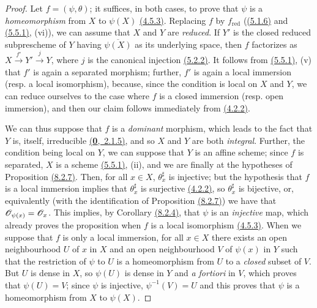 \begin{proof}
\label{proof-prop-1.8.2.8}
Let $f=(\psi,\theta)$; it suffices, in both cases, to prove that $\psi$ is a
{\it homeomorphism} from $X$ to $\psi(X)$ \hyperref[env-1.4.5.3]{(4.5.3)}. Replacing $f$ by
$f_\text{red}$ (\hyperref[env-1.5.1.6]{(5.1.6)} and \hyperref[env-1.5.5.1]{(5.5.1)}, (vi)), we can assume that $X$
and $Y$ are {\it reduced}. If $Y'$ is the closed reduced subprescheme of $Y$
having $\overline{\psi(X)}$ as its underlying space, then $f$ factorizes as
$X\xrightarrow{f'}Y'\xrightarrow{j}Y$, where $j$ is the canonical injection
\hyperref[env-1.5.2.2]{(5.2.2)}. It follows from \hyperref[env-1.5.5.1]{(5.5.1)}, (v) that $f'$ is again a
separated morphism; further, $f'$ is again
a local immersion (resp. a local isomorphism), because, since the condition is local on $X$
and $Y$, we can reduce ourselves to the case where $f$ is a closed immersion (resp. open
immersion), and then our claim follows immediately from \hyperref[env-1.4.2.2]{(4.2.2)}.

We can thus suppose that $f$ is a {\it dominant} morphism, which leads to the
fact that $Y$ is, itself, irreducible \hyperref[env-0.2.1.5]{(\textbf{0},~2.1.5)}, and so $X$ and $Y$
are both {\it integral}. Further, the condition being local on $Y$, we can
suppose that $Y$ is an affine scheme; since $f$ is separated, $X$ is a scheme
\hyperref[env-1.5.5.1]{(5.5.1)}, (ii), and we are finally at the hypotheses of Proposition \hyperref[prop-1.8.2.7]{(8.2.7)}.
Then, for all $x\in X$, $\theta_x^\sharp$ is injective; but the hypothesis that $f$
is a local immersion implies that $\theta_x^\sharp$ is surjective \hyperref[env-1.4.2.2]{(4.2.2)}, so
$\theta_x^\sharp$ is bijective, or, equivalently (with the identification of Proposition
\hyperref[prop-1.8.2.7]{(8.2.7)}) we have that $\mathscr{O}_{\psi(x)}=\mathscr{O}_x$. This implies, by
Corollary \hyperref[cor-1.8.2.4]{(8.2.4)},
that $\psi$ is an {\it injective} map, which already proves the proposition
when $f$ is a local isomorphism \hyperref[env-1.4.5.3]{(4.5.3)}. When we suppose that $f$ is only
a local immersion, for all $x\in X$ there exists an open neighbourhood $U$ of
$x$ in $X$ and an open neighbourhood $V$ of $\psi(x)$ in $Y$ such that the
restriction of $\psi$ to $U$ is a homeomorphism from $U$ to a {\it closed}
subset of $V$. But $U$ is dense in $X$, so $\psi(U)$ is dense in $Y$ and
{\it a fortiori} in $V$, which proves that $\psi(U)=V$; since $\psi$ is
injective, $\psi^{-1}(V)=U$ and this proves that $\psi$ is a homeomorphism from
$X$ to $\psi(X)$.
\end{proof}

